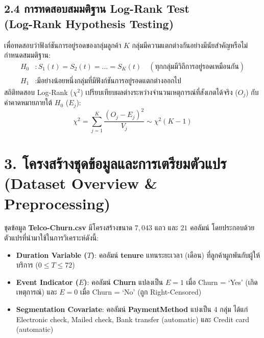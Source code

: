 \documentclass[12pt,a4paper]{article}
\newcommand{\codevar}[1]{\textcolor{codeaccent}{\textbf{#1}}}
\begin{document}
\subsection*{2.4 การทดสอบสมมติฐาน Log-Rank Test\\ \normalsize(Log-Rank Hypothesis Testing)}
เพื่อทดสอบว่าฟังก์ชันการอยู่รอดของกลุ่มลูกค้า $K$ กลุ่มมีความแตกต่างกันอย่างมีนัยสำคัญหรือไม่ กำหนดสมมติฐาน:
\begin{align*}
    H_0 &: S_1(t) = S_2(t) = \dots = S_K(t) \quad (\text{ทุกกลุ่มมีวิถีการอยู่รอดเหมือนกัน}) \\
    H_1 &: \text{มีอย่างน้อยหนึ่งกลุ่มที่มีฟังก์ชันการอยู่รอดแตกต่างออกไป}
\end{align*}
สถิติทดสอบ Log-Rank ($\chi^2$) เปรียบเทียบผลต่างระหว่างจำนวนเหตุการณ์ที่สังเกตได้จริง ($O_j$) กับค่าคาดหมายภายใต้ $H_0$ ($E_j$):
\begin{equation}
    \chi^2 = \sum_{j=1}^K \frac{(O_j - E_j)^2}{V_j} \sim \chi^2(K - 1)
\end{equation}

\section*{3. โครงสร้างชุดข้อมูลและการเตรียมตัวแปร\\ \large(Dataset Overview \& Preprocessing)}

ชุดข้อมูล \codevar{Telco-Churn.csv} มีโครงสร้างขนาด $7,043$ แถว และ $21$ คอลัมน์ โดยประกอบด้วยตัวแปรที่นำมาใช้ในการวิเคราะห์ดังนี้:
\begin{itemize}[leftmargin=18pt, itemsep=2pt]
    \item \textbf{Duration Variable ($T$)}: คอลัมน์ \codevar{tenure} แทนระยะเวลา (เดือน) ที่ลูกค้าผูกพันกับผู้ให้บริการ ($0 \le T \le 72$)
    \item \textbf{Event Indicator ($E$)}: คอลัมน์ \codevar{Churn} แปลงเป็น $E = 1$ เมื่อ Churn = `Yes' (เกิดเหตุการณ์) และ $E = 0$ เมื่อ Churn = `No' (ถูก Right-Censored)
    \item \textbf{Segmentation Covariate}: คอลัมน์ \codevar{PaymentMethod} แบ่งเป็น 4 กลุ่ม ได้แก่ Electronic check, Mailed check, Bank transfer (automatic) และ Credit card (automatic)
\end{itemize}

\begin{table}[H]
\centering
\caption{สถิติเชิงพรรณนาภาพรวมของชุดข้อมูล Telco Churn ($N = 7,043$)}
\end{table}
\end{document}
